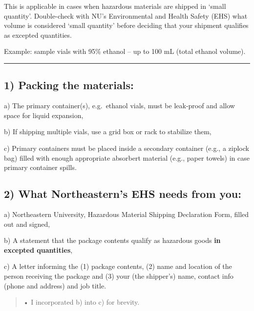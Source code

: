 \documentclass[
  letterpaper,
  DIV=11,
  numbers=noendperiod]{scrreprt}
\begin{document}
This is applicable in cases when hazardous materials are shipped in
`small quantity'. Double-check with NU's Environmental and Health Safety
(EHS) what volume is considered `small quantity' before deciding that
your shipment qualifies as excepted quantities.

Example: sample vials with 95\% ethanol -- up to 100 mL (total ethanol
volume).

\begin{center}\rule{0.5\linewidth}{0.5pt}\end{center}

\hypertarget{packing-the-materials}{%
\subsection*{\texorpdfstring{\textbf{1) Packing the
materials:}}{1) Packing the materials:}}\label{packing-the-materials}}

a) The primary container(s), e.g.~ethanol vials, must be leak-proof and
allow space for liquid expansion,

b) If shipping multiple vials, use a grid box or rack to stabilize them,

c) Primary containers must be placed inside a secondary container (e.g.,
a ziplock bag) filled with enough appropriate absorbert material (e.g.,
paper towels) in case primary container spills.

\hypertarget{what-northeasterns-ehs-needs-from-you}{%
\subsection*{\texorpdfstring{\textbf{2) What Northeastern's EHS needs
from
you:}}{2) What Northeastern's EHS needs from you:}}\label{what-northeasterns-ehs-needs-from-you}}

a) Northeastern University, Hazardous Material Shipping Declaration
Form, filled out and signed,

b) A statement that the package contents qualify as hazardous goods
\textbf{in excepted quantities},

c) A letter informing the (1) package contents, (2) name and location of
the person receiving the package and (3) your (the shipper's) name,
contact info (phone and address) and job title.

\begin{quote}
• I incorporated b) into c) for brevity.
\end{quote}
\end{document}
